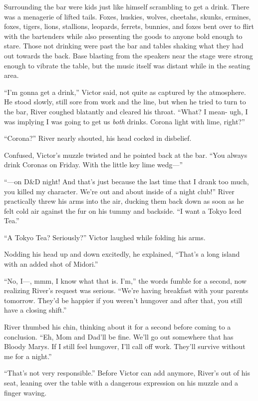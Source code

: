 Surrounding the bar were kids just like himself scrambling to get a
drink. There was a menagerie of lifted tails. Foxes, huskies, wolves,
cheetahs, skunks, ermines, foxes, tigers, lions, stallions, leopards,
ferrets, bunnies, and foxes bent over to flirt with the bartenders while
also presenting the goods to anyone bold enough to stare. Those not
drinking were past the bar and tables shaking what they had out towards
the back. Base blasting from the speakers near the stage were strong
enough to vibrate the table, but the music itself was distant while in
the seating area.

``I'm gonna get a drink,'' Victor said, not quite as captured by the
atmosphere. He stood slowly, still sore from work and the line, but when
he tried to turn to the bar, River coughed blatantly and cleared his
throat. ``What? I mean- ugh, I was implying I was going to get us
\emph{both} drinks. Corona light with lime, right?''

``Corona?'' River nearly shouted, his head cocked in disbelief.

Confused, Victor's muzzle twisted and he pointed back at the bar. ``You
always drink Coronas on Friday. With the little key lime wedg---''

``---on D\&D night! And that's just because the last time that I drank
too much, you killed my character. We're out and about inside of a night
club!'' River practically threw his arms into the air, ducking them back
down as soon as he felt cold air against the fur on his tummy and
backside. ``I want a Tokyo Iced Tea.''

``A Tokyo Tea? Seriously?'' Victor laughed while folding his arms.

Nodding his head up and down excitedly, he explained, ``That's a long
island with an added shot of Midori.''

``No, I---, mmm, I know what that is. I'm,'' the words fumble for a
second, now realizing River's request was serious. ``We're having
breakfast with your parents tomorrow. They'd be happier if you weren't
hungover and after that, you still have a closing shift.''

River thumbed his chin, thinking about it for a second before coming to
a conclusion. ``Eh, Mom and Dad'll be fine. We'll go out somewhere that
has Bloody Marys. If I still feel hungover, I'll call off work. They'll
survive without me for a night.''

``That's not very responsible.'' Before Victor can add anymore, River's
out of his seat, leaning over the table with a dangerous expression on
his muzzle and a finger waving.

